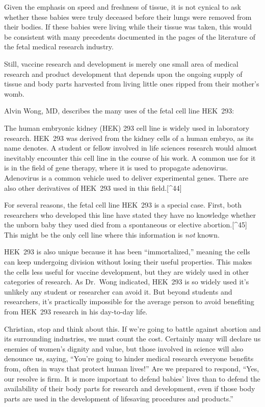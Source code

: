 \documentclass[
]{book}
\begin{document}
Given the emphasis on speed and freshness of tissue, it is not cynical to ask whether these babies were truly deceased before their lungs were removed from their bodies. If these babies were living while their tissue was taken, this would be consistent with many precedents documented in the pages of the literature of the fetal medical research industry.

Still, vaccine research and development is merely one small area of medical research and product development that depends upon the ongoing supply of tissue and body parts harvested from living little ones ripped from their mother's womb.

Alvin Wong, MD, describes the many uses of the fetal cell line HEK~293:

The human embryonic kidney (HEK) 293 cell line is widely used in laboratory research. HEK~293 was derived from the kidney cells of a human embryo, as its name denotes. A student or fellow involved in life sciences research would almost inevitably encounter this cell line in the course of his work. A common use for it is in the field of gene therapy, where it is used to propagate adenovirus. Adenovirus is a common vehicle used to deliver experimental genes. There are also other derivatives of HEK~293 used in this field.{[}\^{}44{]}

For several reasons, the fetal cell line HEK~293 is a special case. First, both researchers who developed this line have stated they have no knowledge whether the unborn baby they used died from a spontaneous or elective abortion.{[}\^{}45{]} This might be the only cell line where this information is \emph{not} known.

HEK~293 is also unique because it has been ``immortalized,'' meaning the cells can keep undergoing division without losing their useful properties. This makes the cells less useful for vaccine development, but they are widely used in other categories of research. As Dr.~Wong indicated, HEK~293 is so widely used it's unlikely any student or researcher can avoid it. But beyond students and researchers, it's practically impossible for the average person to avoid benefiting from HEK~293 research in his day-to-day life.

Christian, stop and think about this. If we're going to battle against abortion and its surrounding industries, we must count the cost. Certainly many will declare us enemies of women's dignity and value, but those involved in science will also denounce us, saying, ``You're going to hinder medical research everyone benefits from, often in ways that protect human lives!'' Are we prepared to respond, ``Yes, our resolve is firm. It is more important to defend babies' lives than to defend the availability of their body parts for research and development, even if those body parts are used in the development of lifesaving procedures and products.''
\end{document}
